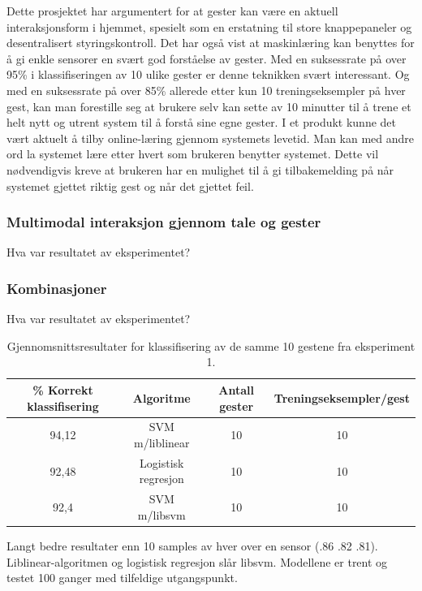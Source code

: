 Dette prosjektet har argumentert for at gester kan være en aktuell interaksjonsform i hjemmet, spesielt som en erstatning til store knappepaneler og desentralisert styringskontroll. Det har også vist at maskinlæring kan benyttes for å gi enkle sensorer en svært god forståelse av gester. Med en suksessrate på over 95\% i klassifiseringen av 10 ulike gester er denne teknikken svært interessant. Og med en suksessrate på over 85\% allerede etter kun 10 treningseksempler på hver gest, kan man forestille seg at brukere selv kan sette av 10 minutter til å trene et helt nytt og utrent system til å forstå sine egne gester. I et produkt kunne det vært aktuelt å tilby online-læring gjennom systemets levetid. Man kan med andre ord la systemet lære etter hvert som brukeren benytter systemet. Dette vil nødvendigvis kreve at brukeren har en mulighet til å gi tilbakemelding på når systemet gjettet riktig gest og når det gjettet feil.

\subsubsection{Multimodal interaksjon gjennom tale og gester}
{\color{red}Hva var resultatet av eksperimentet?}


\subsubsection{Kombinasjoner}
{\color{red}Hva var resultatet av eksperimentet?}

\begin{table}[h!]
\centering
\begin{tabular}{|| c c c c ||}
\hline
\% Korrekt klassifisering & Algoritme & Antall gester & Treningseksempler/gest \\ [0.5ex] 
 \hline\hline
 94,12 & SVM m/liblinear & 10 & 10 \\ 
 \hline
 92,48 & Logistisk regresjon & 10 & 10 \\ [1ex]
 \hline
 92,4 & SVM m/libsvm & 10 & 10 \\
 \hline
\end{tabular}
\caption{Gjennomsnittsresultater for klassifisering av de samme 10 gestene fra eksperiment 1.}
\label{table:results-foursensors}
\end{table}

Langt bedre resultater enn 10 samples av hver over en sensor (.86 .82 .81). Liblinear-algoritmen og logistisk regresjon slår libsvm.  Modellene er trent og testet 100 ganger med tilfeldige utgangspunkt.


